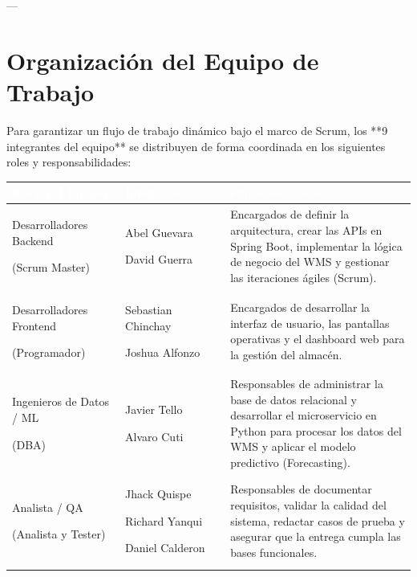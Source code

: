 \documentclass[11pt]{article}
\newcounter{none} %
\begin{document}
---

\section{Organización del Equipo de Trabajo}

Para garantizar un flujo de trabajo dinámico bajo el marco de Scrum, los **9 integrantes del equipo** se distribuyen de forma coordinada en los siguientes roles y responsabilidades:

\vspace{0.3cm}
\setlength{\tabcolsep}{5pt}
\renewcommand{\arraystretch}{1.5}
{\def\LTcaptype{none}
\begin{longtable}[]{@{}
  >{\raggedright\arraybackslash}p{0.28\linewidth}
  >{\raggedright\arraybackslash}p{0.26\linewidth}
  >{\raggedright\arraybackslash}p{0.46\linewidth}@{}}
\rowcolor{DeepNavy}
\textcolor{white}{\textbf{Rol en el Equipo}} & \textcolor{white}{\textbf{Integrantes}} & \textcolor{white}{\textbf{Funciones Clave}} \\ \hline
\endhead
\rowcolor{LightGray}
Desarrolladores Backend \par (Scrum Master) & Abel Guevara \par David Guerra & Encargados de definir la arquitectura, crear las APIs en Spring Boot, implementar la lógica de negocio del WMS y gestionar las iteraciones ágiles (Scrum). \\ \hline
Desarrolladores Frontend \par (Programador) & Sebastian Chinchay \par Joshua Alfonzo & Encargados de desarrollar la interfaz de usuario, las pantallas operativas y el dashboard web para la gestión del almacén. \\ \hline
\rowcolor{LightGray}
Ingenieros de Datos / ML \par (DBA) & Javier Tello \par Alvaro Cuti & Responsables de administrar la base de datos relacional y desarrollar el microservicio en Python para procesar los datos del WMS y aplicar el modelo predictivo (Forecasting). \\ \hline
Analista / QA \par (Analista y Tester) & Jhack Quispe \par Richard Yanqui \par Daniel Calderon & Responsables de documentar requisitos, validar la calidad del sistema, redactar casos de prueba y asegurar que la entrega cumpla las bases funcionales. \\ \hline
\end{longtable}
}
\end{document}
